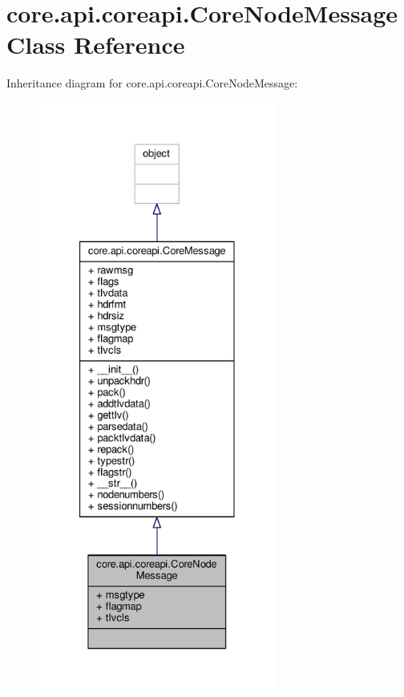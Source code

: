 \hypertarget{classcore_1_1api_1_1coreapi_1_1_core_node_message}{\section{core.\+api.\+coreapi.\+Core\+Node\+Message Class Reference}
\label{classcore_1_1api_1_1coreapi_1_1_core_node_message}
}


Inheritance diagram for core.\+api.\+coreapi.\+Core\+Node\+Message\+:
\nopagebreak
\begin{figure}[H]
\begin{center}
\leavevmode
\includegraphics[height=550pt]{classcore_1_1api_1_1coreapi_1_1_core_node_message__inherit__graph}
\end{center}
\end{figure}


